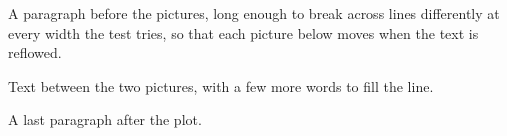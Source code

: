 \documentclass{article}
\begin{document}
A paragraph before the pictures, long enough to break across lines
differently at every width the test tries, so that each picture below
moves when the text is reflowed.

\begin{center}
\end{center}
Text between the two pictures, with a few more words to fill the line.

\begin{center}
\end{center}
A last paragraph after the plot.
\end{document}
